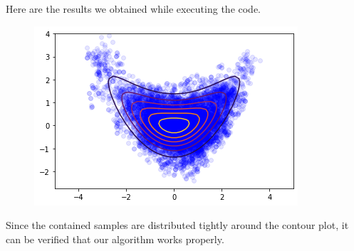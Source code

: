 Here are the results we obtained while executing the code.
\begin{figure}[h]
	\centering
	\includegraphics[width=.4\textwidth]{4.png}
\end{figure}
Since the contained samples are distributed tightly around the contour plot, it can be verified that our algorithm works properly.